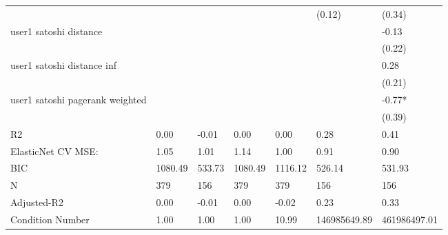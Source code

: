\begin{table}
\begin{center}
\begin{tabular}{lllllll}
                                               &          &         &         &         & (0.12)       & (0.34)        \\
user1 satoshi distance                         &          &         &         &         &              & -0.13         \\
                                               &          &         &         &         &              & (0.22)        \\
user1 satoshi distance inf                     &          &         &         &         &              & 0.28          \\
                                               &          &         &         &         &              & (0.21)        \\
user1 satoshi pagerank weighted                &          &         &         &         &              & -0.77*        \\
                                               &          &         &         &         &              & (0.39)        \\
R2                                             & 0.00     & -0.01   & 0.00    & 0.00    & 0.28         & 0.41          \\
ElasticNet CV MSE:                             & 1.05     & 1.01    & 1.14    & 1.00    & 0.91         & 0.90          \\
BIC                                            & 1080.49  & 533.73  & 1080.49 & 1116.12 & 526.14       & 531.93        \\
N                                              & 379      & 156     & 379     & 379     & 156          & 156           \\
Adjusted-R2                                    & 0.00     & -0.01   & 0.00    & -0.02   & 0.23         & 0.33          \\
Condition Number                               & 1.00     & 1.00    & 1.00    & 10.99   & 146985649.89 & 461986497.01  \\
\hline
\end{tabular}
\end{center}
\end{table}